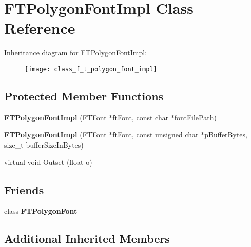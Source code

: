 \hypertarget{class_f_t_polygon_font_impl}{\section{F\-T\-Polygon\-Font\-Impl Class Reference}
\label{class_f_t_polygon_font_impl}
}
Inheritance diagram for F\-T\-Polygon\-Font\-Impl\-:\begin{figure}[H]
\begin{center}
\leavevmode
\texttt{[image: class\_f\_t\_polygon\_font\_impl]}
\end{center}
\end{figure}
\subsection*{Protected Member Functions}
\begin{DoxyCompactItemize}
\item 
\hypertarget{class_f_t_polygon_font_impl_adbe87469ee12af1a0a1b7999ede7cc98}{{\bfseries F\-T\-Polygon\-Font\-Impl} (F\-T\-Font $\ast$ft\-Font, const char $\ast$font\-File\-Path)}\label{class_f_t_polygon_font_impl_adbe87469ee12af1a0a1b7999ede7cc98}

\item 
\hypertarget{class_f_t_polygon_font_impl_a140310c1898543ff1dec5865841b630b}{{\bfseries F\-T\-Polygon\-Font\-Impl} (F\-T\-Font $\ast$ft\-Font, const unsigned char $\ast$p\-Buffer\-Bytes, size\-\_\-t buffer\-Size\-In\-Bytes)}\label{class_f_t_polygon_font_impl_a140310c1898543ff1dec5865841b630b}

\item 
virtual void \hyperlink{class_f_t_polygon_font_impl_ac565010b774c7ddb84db28b422ea9b3e}{Outset} (float o)
\end{DoxyCompactItemize}
\subsection*{Friends}
\begin{DoxyCompactItemize}
\item 
\hypertarget{class_f_t_polygon_font_impl_abd1c273c43e47346ad6c178ec173cc41}{class {\bfseries F\-T\-Polygon\-Font}}\label{class_f_t_polygon_font_impl_abd1c273c43e47346ad6c178ec173cc41}

\end{DoxyCompactItemize}
\subsection*{Additional Inherited Members}


